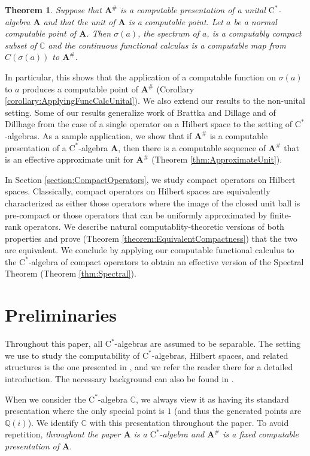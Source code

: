 \documentclass{amsart}
\newcommand{\boldA}{\mathbf{A}}
\newcommand{\cstar}{$\mathrm{C}^*$}
\theoremstyle{plain}
\newtheorem{theorem}{Theorem}[section]
\theoremstyle{definition}
\numberwithin{equation}{section}
\begin{document}
\begin{theorem}
Suppose that $\boldA^\#$ is a computable presentation of a unital \cstar-algebra $\boldA$ and that the unit of $\boldA$ is a computable point.  Let $a$ be a normal computable point of $\boldA$.  Then $\sigma(a)$, the spectrum of $a$, is a computably compact subset of $\mathbb{C}$ and the continuous functional calculus is a computable map from $C(\sigma(a))$ to $\boldA^\#$.
\end{theorem}

In particular, this shows that the application of a computable function on $\sigma(a)$ to $a$ produces a computable point of $\boldA^\#$ (Corollary \ref{corollary:ApplyingFuncCalcUnital}).  We also extend our results to the non-unital setting.  Some of our results generalize work of Brattka and Dillage \cite{BrattkaDillhage.2005} and of Dillhage \cite{Dillhage.2008} from the case of a single operator on a Hilbert space to the setting of \cstar-algebras.  As a sample application, we show that if $\boldA^\#$ is a computable presentation of a \cstar-algebra $\boldA$, then there is a computable sequence of $\boldA^\#$ that is an effective approximate unit for $\boldA^\#$ (Theorem \ref{thm:ApproximateUnit}).

In Section \ref{section:CompactOperators}, we study compact operators on Hilbert spaces.  Classically, compact operators on Hilbert spaces are equivalently characterized as either those operators where the image of the closed unit ball is pre-compact or those operators that can be uniformly approximated by finite-rank operators.  We describe natural computablity-theoretic versions of both properties and prove (Theorem \ref{theorem:EquivalentCompactness}) that the two are equivalent.  We conclude by applying our computable functional calculus to the \cstar-algebra of compact operators to obtain an effective version of the Spectral Theorem (Theorem \ref{thm:Spectral}).

\section{Preliminaries}\label{}
Throughout this paper, all \cstar-algebras are assumed to be separable.  The setting we use to study the computability of \cstar-algebras, Hilbert spaces, and related structures is the one presented in \cite{EMST}, and we refer the reader there for a detailed introduction.  The necessary background can also be found in \cite{UHFPaper}.

When we consider the \cstar-algebra $\mathbb{C}$, we always view it as having its standard presentation where the only special point is $1$ (and thus the generated points are $\mathbb{Q}(i)$).  We identify $\mathbb{C}$ with this presentation throughout the paper.  To avoid repetition, \emph{throughout the paper $\boldA$ is a \cstar-algebra and $\boldA^\#$ is a fixed computable presentation of $\boldA$}.  
\end{document}
